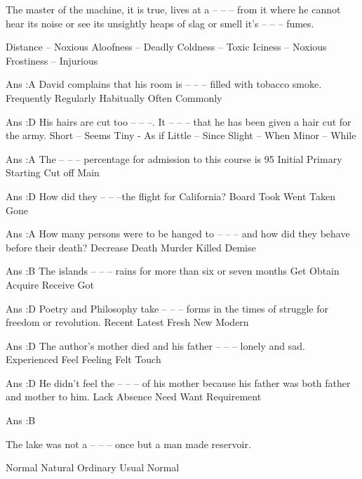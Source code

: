     The master of the machine, it is true, lives at a -- -- -- from it where he cannot hear its noise or see its unsightly heaps of slag or smell it’s -- -- -- fumes.

        Distance – Noxious
        Aloofness – Deadly
        Coldness – Toxic
        Iciness – Noxious
        Frostiness – Injurious 

    Ans :A
    David complains that his room is -- -- -- filled with tobacco smoke.
        Frequently
        Regularly
        Habitually
        Often
        Commonly 

    Ans :D
    His hairs are cut too -- -- --. It -- -- -- that he has been given a hair cut for the army.
        Short – Seems
        Tiny - As if
        Little – Since
        Slight – When
        Minor – While 

    Ans :A
    The -- -- -- percentage for admission to this course is 95%
        Initial
        Primary
        Starting
        Cut off
        Main 

    Ans :D
    How did they -- -- --the flight for California?
        Board
        Took
        Went
        Taken
        Gone 

    Ans :A
    How many persons were to be hanged to -- -- -- and how did they behave before their death?
        Decrease
        Death
        Murder
        Killed
        Demise 

    Ans :B
    The islands -- -- -- rains for more than six or seven months
        Get
        Obtain
        Acquire
        Receive
        Got 

    Ans :D
    Poetry and Philosophy take -- -- -- forms in the times of struggle for freedom or revolution.
        Recent
        Latest
        Fresh
        New
        Modern 

    Ans :D
    The author’s mother died and his father -- -- -- lonely and sad.
        Experienced
        Feel
        Feeling
        Felt
        Touch 

    Ans :D
    He didn’t feel the -- -- -- of his mother because his father was both father and mother to him.
        Lack
        Absence
        Need
        Want
        Requirement 

    Ans :B 




    The lake was not a -- -- -- once but a man made reservoir.

        Normal
        Natural
        Ordinary
        Usual
        Normal 

